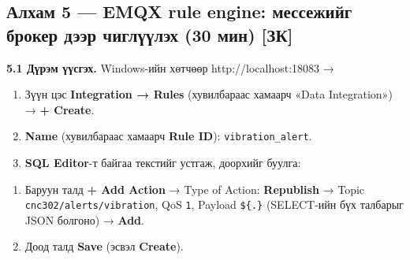 \hypertarget{ux430ux43bux445ux430ux43c-5-emqx-rule-engine-ux43cux435ux441ux441ux435ux436ux438ux439ux433-ux431ux440ux43eux43aux435ux440-ux434ux44dux44dux440-ux447ux438ux433ux43bux4afux4afux43bux44dux445-30-ux43cux438ux43d-ux437ux43a}{%
\subsection{Алхам 5 --- EMQX rule engine: мессежийг брокер дээр чиглүүлэх (30 мин) {[}ЗК{]}}\label{ux430ux43bux445ux430ux43c-5-emqx-rule-engine-ux43cux435ux441ux441ux435ux436ux438ux439ux433-ux431ux440ux43eux43aux435ux440-ux434ux44dux44dux440-ux447ux438ux433ux43bux4afux4afux43bux44dux445-30-ux43cux438ux43d-ux437ux43a}}

\textbf{5.1 Дүрэм үүсгэх.} Windows-ийн хөтчөөр http://localhost:18083 →

\begin{enumerate}
\def\labelenumi{\arabic{enumi}.}
\tightlist
\item
  Зүүн цэс \textbf{Integration → Rules} (хувилбараас хамаарч «Data Integration») → \textbf{+ Create}.
\item
  \textbf{Name} (хувилбараас хамаарч \textbf{Rule ID}): \texttt{vibration\_alert}.
\item
  \textbf{SQL Editor}-т байгаа текстийг устгаж, доорхийг буулга:
\end{enumerate}

\begin{Shaded}
\begin{Highlighting}[]
 \NormalTok{,}
               
\OperatorTok{\textgreater{}} 
\end{Highlighting}
\end{Shaded}

\begin{enumerate}
\def\labelenumi{\arabic{enumi}.}
\setcounter{enumi}{3}
\tightlist
\item
  Баруун талд \textbf{+ Add Action} → Type of Action: \textbf{Republish} → Topic \texttt{cnc302/\allowbreak{}alerts/\allowbreak{}vibration}, QoS \texttt{1}, Payload \texttt{\$\{.\}} (SELECT-ийн бүх талбарыг JSON болгоно) → \textbf{Add}.
\item
  Доод талд \textbf{Save} (эсвэл \textbf{Create}).
\end{enumerate}

